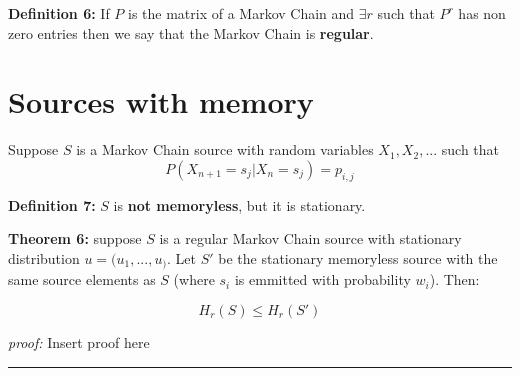 \documentclass{article}
\begin{document}
\noindent \textbf{Definition 	6:} If $P$ is the matrix of a Markov Chain and $\exists r$ such that $P^r$ has non zero entries then we say that the Markov Chain is \textbf{regular}.

  
  \section{Sources with memory}
  
Suppose $S$ is a Markov Chain source with random variables $X_1, X_2, ...$ such that
$$
P(X_{n + 1} = s_j | X_{n} = s_j ) = p_{i, j}
$$

\noindent \textbf{Definition 	7:} $S$ is \textbf{not memoryless}, but it is stationary.

 \noindent \textbf{Theorem  6:} suppose $S$ is a regular Markov Chain source with stationary distribution $u = (u_1, ..., u_)$. Let $S'$ be the stationary memoryless source with the same source elements as $S$ (where $s_i$ is emmitted with probability $w_i$). Then:
 
 $$
 H_{r} (S) \leq H_{r} (S')
 $$
 
 \noindent\textit{proof:}  Insert proof here

\noindent
{\color{gray} \rule{\linewidth}{0.5mm} }
\end{document}
